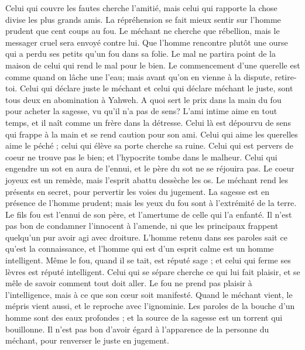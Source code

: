 \begin{multicols}{2}
Celui qui couvre les fautes cherche l'amitié, mais celui qui rapporte la chose divise les plus grands amis.
La répréhension se fait mieux sentir sur l'homme prudent que cent coups au fou.
Le méchant ne cherche que rébellion, mais le messager cruel sera envoyé contre lui.
Que l'homme rencontre plutôt une ourse qui a perdu ses petits qu'un fou dans sa folie.
Le mal ne partira point de la maison de celui qui rend le mal pour le bien.
Le commencement d'une querelle est comme quand on lâche une l'eau; mais avant qu'on en vienne à la dispute, retire-toi.
Celui qui déclare juste le méchant et celui qui déclare méchant le juste, sont tous deux en abomination à Yahweh.
A quoi sert le prix dans la main du fou pour acheter la sagesse, vu qu'il n'a pas de sens?
L'ami intime aime en tout temps, et il naît comme un frère dans la détresse.
Celui là est dépourvu de sens qui frappe à la main et se rend caution pour son ami.
Celui qui aime les querelles aime le péché ; celui qui élève sa porte cherche sa ruine.
Celui qui est pervers de coeur ne trouve pas le bien; et l'hypocrite tombe dans le malheur.
Celui qui engendre un sot en aura de l'ennui, et le père du sot ne se réjouira pas.
Le coeur joyeux est un remède, mais l'esprit abattu dessèche les os.
Le méchant rend les présents en secret, pour pervertir les voies du jugement.
La sagesse est en présence de l'homme prudent; mais les yeux du fou sont à l'extrémité de la terre.
Le fils fou est l'ennui de son père, et l'amertume de celle qui l'a enfanté.
Il n'est pas bon de condamner l'innocent à l'amende, ni que les principaux frappent quelqu'un pur avoir agi avec droiture.
L'homme retenu dans ses paroles sait ce qu'est la connaissance, et l'homme qui est d'un esprit calme est un homme intelligent.
Même le fou, quand il se tait, est réputé sage ; et celui qui ferme ses lèvres est réputé intelligent.
\VerseOne{}Celui qui se sépare cherche ce qui lui fait plaisir, et se mêle de savoir comment tout doit aller.
Le fou ne prend pas plaisir à l'intelligence, mais à ce que son cœur soit manifesté.
Quand le méchant vient, le mépris vient aussi, et le reproche avec l'ignominie.
Les paroles de la bouche d'un homme sont des eaux profondes ; et la source de la sagesse est un torrent qui bouillonne.
Il n'est pas bon d'avoir égard à l'apparence de la personne du méchant, pour renverser le juste en jugement.

\end{multicols}
